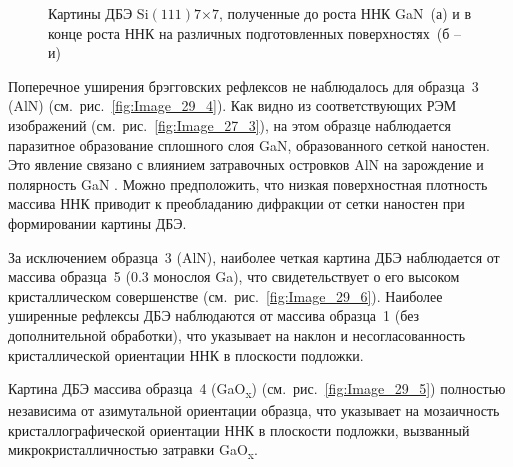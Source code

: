 \begin{figure}[ht]   \caption{Картины ДБЭ
				Si\((111)7\)\(\times\)\(7\), полученные до роста ННК GaN~(а) и в конце
				роста ННК на различных подготовленных поверхностях~(б --
		и)}\label{fig:Image_29} \end{figure}

Поперечное уширения брэгговских рефлексов не наблюдалось для образца~3 (AlN)
(см.~рис.~\cref{fig:Image_29_4}). Как видно из соответствующих РЭМ изображений
(см.~рис.~\cref{fig:Image_27_3}), на этом образце наблюдается паразитное
образование сплошного слоя GaN, образованного сеткой наностен. Это явление
связано с влиянием затравочных островков AlN на зарождение и полярность GaN
\cite{Zhong2018}. Можно предположить, что низкая поверхностная плотность
массива ННК приводит к преобладанию дифракции от сетки наностен при
формировании картины ДБЭ.

За исключением образца~3 (AlN), наиболее четкая картина ДБЭ наблюдается от
массива образца~5 (0.3 монослоя Ga), что свидетельствует о его высоком
кристаллическом совершенстве (см.~рис.~\cref{fig:Image_29_6}). Наиболее
уширенные рефлексы ДБЭ наблюдаются от массива образца~1 (без дополнительной
обработки), что указывает на наклон и несогласованность кристаллической
ориентации ННК в плоскости подложки.

Картина ДБЭ массива образца~4 (GaO\textsubscript{x})
(см.~рис.~\cref{fig:Image_29_5}) полностью независима от азимутальной
ориентации образца, что указывает на мозаичность кристаллографической
ориентации ННК в плоскости подложки, вызванный микрокристалличностью затравки
GaO\textsubscript{x}.

